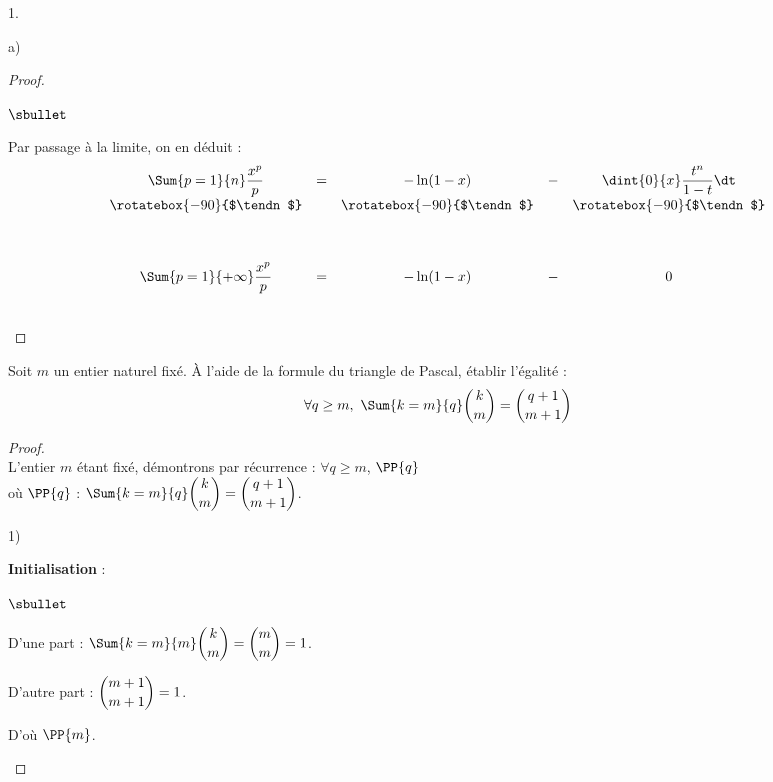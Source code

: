 \begin{noliste}{1.}
\begin{noliste}{a)}
\begin{proof}
\begin{noliste}{$\sbullet$}
      \item Par passage à la limite, on en déduit :
        \[
        \begin{array}{ccccc}
          \Sum{p = 1}{n} \dfrac{x^{p}}{p} & = & - \ln(1-x) & - &
          \dint{0}{x} \dfrac{t^{n}}{1-t} \dt 
          \\[.2cm]
          \rotatebox{-90}{$\tendn$} & & \rotatebox{-90}{$\tendn$} & &
          \rotatebox{-90}{$\tendn$} 
          \\[1.2cm]
          \Sum{p = 1}{+\infty} \dfrac{x^{p}}{p} & = & - \ln(1-x) & - &
          0
        \end{array}
        \]

      \end{noliste}
      ~\\[-1cm]
    \end{proof}

  \end{noliste}


  \newpage


\item Soit $m$ un entier naturel fixé. À l'aide de la formule du
  triangle de Pascal, établir l'égalité :
  \[
  \forall q \geq m, \ \Sum{k = m}{q} \dbinom{k}{m} = \dbinom{q + 1}{m
    + 1}
  \]

  \begin{proof}~\\
    L'entier $m$ étant fixé, démontrons par récurrence : $\forall
    q \geq m$, $\PP{q}$ \\
    où $\PP{q}$ : $\Sum{k=m}{q} \dbinom{k}{m} = \dbinom{q+1}{m+1}$.
    \begin{noliste}{1)}
    \item {\bf Initialisation} :
      \begin{noliste}{$\sbullet$}
      \item D'une part : $\Sum{k=m}{m} \dbinom{k}{m} = \dbinom{m}{m} =
        1$.
      \item D'autre part : $\dbinom{m+1}{m+1} = 1$.        
      \end{noliste}
      D'où $\PP{m}$.
      

\end{noliste}
\end{proof}
\end{noliste}
